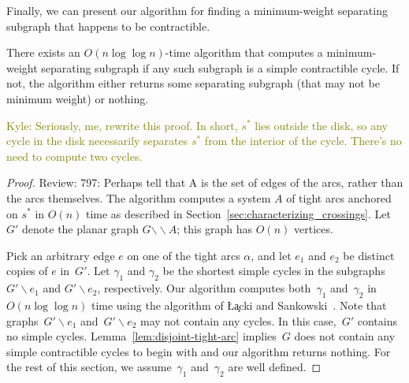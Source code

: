 \documentclass[letterpaper,review]{siamart190516}
\def\snip{\mathbin{\raisebox{0.15ex}{\rotatebox[origin=c]{60}{\Rightscissors}\!}}}
\def\snip{\mathbin{\backslash\!\!\backslash}}
\def\subsnip{\mathbin{\raisebox{0.15ex}{\rotatebox[origin=c]{60}{\footnotesize\Rightscissors}\!}}}
\def\Gsnip{\mathord{G_{\subsnip}}}
\def\Gsnip{G'}
\def\rnote#1{\color{red}Review: #1 \color{black}}
\def\knote#1{\textcolor{olive}{Kyle: #1}}
\begin{document}
{


Finally, we can present our algorithm for finding a minimum-weight separating subgraph that happens
to be contractible.
\begin{lemma}
\label{lem:contractible-alg}
There exists an $O(n \log \log n)$-time algorithm that computes a minimum-weight separating subgraph if any such subgraph is a simple contractible cycle. If not, the algorithm either returns some separating subgraph (that may not be minimum weight) or nothing.
\end{lemma}

\knote{Seriously, me, rewrite this proof.
In short, \(s^*\) lies outside the disk, so any cycle in the disk necessarily separates \(s^*\) from
the interior of the cycle.
There's no need to compute two cycles.}

\begin{proof}

\rnote{797: Perhaps tell that A is the set of edges of the arcs, rather than the arcs themselves. }
The algorithm computes a system $A$ of tight arcs anchored on $s^*$ in $O(n)$ time as described in
Section~\ref{sec:characterizing_crossings}.
Let $\Gsnip$ denote the planar graph $G \snip A$; this graph has $O(n)$ vertices.

Pick an arbitrary edge $e$ on one of the tight arcs $\alpha$, and let $e_1$ and $e_2$ be distinct
copies of $e$
in~$\Gsnip$.  Let $\gamma_1$ and $\gamma_2$ be the shortest simple cycles in the  subgraphs $\Gsnip
\backslash e_1$ and $\Gsnip \backslash e_2$, respectively.  Our algorithm computes both~$\gamma_1$
and~$\gamma_2$ in $O(n \log\log n)$ time using the algorithm of \L\c{a}cki and
Sankowski~\cite{ls-mcsc-11}. Note that graphs~$\Gsnip \backslash e_1$ and~$\Gsnip \backslash e_2$
may not contain any cycles. In this case,~$\Gsnip$ contains no simple cycles.
Lemma~\ref{lem:disjoint-tight-arc} implies~$G$ does not contain any simple contractible cycles to begin with and our algorithm returns nothing. 
For the rest of this section, we assume~$\gamma_1$ and~$\gamma_2$ are well defined.


\end{proof}}
\end{document}
